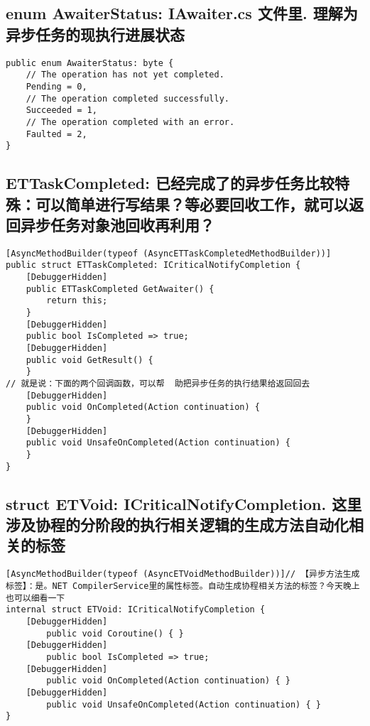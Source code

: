\documentclass[9pt, b5paper]{article}
\begin{document}
\subsection{enum AwaiterStatus: IAwaiter.cs 文件里. 理解为异步任务的现执行进展状态}
\label{sec-11-1}
\begin{verbatim}
public enum AwaiterStatus: byte {
    // The operation has not yet completed.
    Pending = 0,
    // The operation completed successfully.
    Succeeded = 1,
    // The operation completed with an error.
    Faulted = 2,
}
\end{verbatim}
\subsection{ETTaskCompleted: 已经完成了的异步任务比较特殊：可以简单进行写结果？等必要回收工作，就可以返回异步任务对象池回收再利用？}
\label{sec-11-2}
\begin{verbatim}
[AsyncMethodBuilder(typeof (AsyncETTaskCompletedMethodBuilder))]
public struct ETTaskCompleted: ICriticalNotifyCompletion {
    [DebuggerHidden]
    public ETTaskCompleted GetAwaiter() {
        return this;
    }
    [DebuggerHidden]
    public bool IsCompleted => true;
    [DebuggerHidden]
    public void GetResult() {
    }
// 就是说：下面的两个回调函数，可以帮  助把异步任务的执行结果给返回回去
    [DebuggerHidden]
    public void OnCompleted(Action continuation) {              
    }
    [DebuggerHidden]
    public void UnsafeOnCompleted(Action continuation) {  
    }
}
\end{verbatim}
\subsection{struct ETVoid: ICriticalNotifyCompletion. 这里涉及协程的分阶段的执行相关逻辑的生成方法自动化相关的标签}
\label{sec-11-3}
\begin{verbatim}
[AsyncMethodBuilder(typeof (AsyncETVoidMethodBuilder))]// 【异步方法生成标签】：是。NET CompilerService里的属性标签。自动生成协程相关方法的标签？今天晚上也可以细看一下
internal struct ETVoid: ICriticalNotifyCompletion {
    [DebuggerHidden]
        public void Coroutine() { }
    [DebuggerHidden]
        public bool IsCompleted => true;
    [DebuggerHidden]
        public void OnCompleted(Action continuation) { }
    [DebuggerHidden]
        public void UnsafeOnCompleted(Action continuation) { }
}
\end{verbatim}
\end{document}
